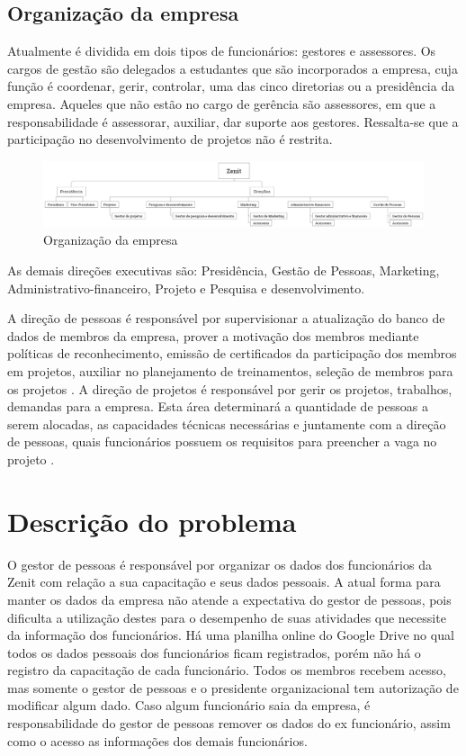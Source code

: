 \subsection{Organização da empresa}
Atualmente é dividida em dois tipos de funcionários: gestores e assessores. Os cargos de gestão são delegados a estudantes que são incorporados a empresa, cuja função é coordenar, gerir, controlar, uma das cinco diretorias ou a presidência da empresa. Aqueles que não estão no cargo de gerência são assessores, em que a responsabilidade é assessorar, auxiliar, dar suporte aos gestores. Ressalta-se que a participação no desenvolvimento de projetos não é restrita.

\begin{figure}[H]
    \centering
    \label{organizacaoZenit}
    \includegraphics[keepaspectratio=true,scale=0.3]{figuras/zenitOrganograma.eps}
    \caption[Organização da empresa]{Organização da empresa}
\end{figure}

As demais direções executivas são: Presidência, Gestão de Pessoas, Marketing, Administrativo-financeiro, Projeto e Pesquisa e desenvolvimento. 

A direção de pessoas é responsável por supervisionar a atualização do banco de dados de membros da empresa, prover a motivação dos membros mediante políticas de reconhecimento, emissão de certificados da participação dos membros em projetos, auxiliar no planejamento de treinamentos, seleção de membros para os projetos \cite{regimentoInternoZenit}.
A direção de projetos é responsável por gerir os projetos, trabalhos, demandas para a empresa. Esta área determinará a quantidade de pessoas a serem alocadas, as capacidades técnicas necessárias e juntamente com a direção de pessoas, quais funcionários possuem os requisitos para preencher a vaga no projeto \cite{regimentoInternoZenit}.

\section{Descrição do problema}
O gestor de pessoas é responsável por organizar os dados dos funcionários da Zenit com relação a sua capacitação e seus dados pessoais. A atual forma para manter os dados da empresa não atende a expectativa do gestor de pessoas, pois dificulta a utilização destes para o desempenho de suas atividades que necessite da informação dos funcionários. Há uma planilha online do Google Drive no qual todos os dados pessoais dos funcionários ficam registrados, porém não há o registro da capacitação de cada funcionário. Todos os membros recebem acesso, mas somente o gestor de pessoas e o presidente organizacional tem autorização de modificar algum dado. Caso algum funcionário saia da empresa, é responsabilidade do gestor de pessoas remover os dados do ex funcionário, assim como o acesso as informações dos demais funcionários.

